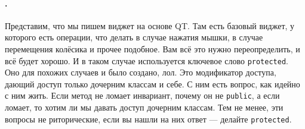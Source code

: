 \documentclass{article}
\begin{document}
    \paragraph{.}
    Представим, что мы пишем виджет на основе QT. Там есть базовый виджет, у которого есть операции, что делать в случае нажатия мышки, в случае перемещения колёсика и прочее подобное. Вам всё это нужно переопределить, и всё будет хорошо. И в таком случае используется ключевое слово \texttt{protected}. Оно для похожих случаев и было создано, лол. Это модификатор доступа, дающий доступ только дочерним классам и себе. С ним есть вопрос, как идейно с ним жить. Если метод не ломает инвариант, почему он не \texttt{public}, а если ломает, то хотим ли мы давать доступ дочерним классам. Тем не менее, эти вопросы не риторические, если вы нашли на них ответ --- делайте \texttt{protected}.
\end{document}
